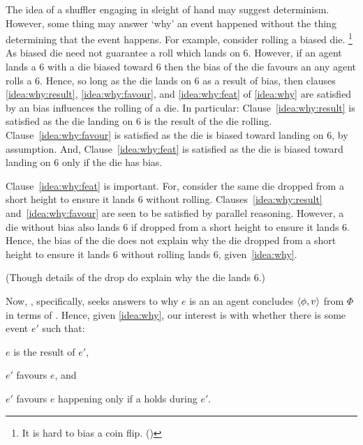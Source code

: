 \begin{note}
  The idea of a shuffler engaging in sleight of hand may suggest determinism.
  However, some thing may answer `why' an event happened without the thing determining that the event happens.
  For example, consider rolling a biased die.%
  \footnote{
    It is hard to bias a coin flip. (\cite{Gelman:2002ww})
  }
  As biased die need not guarantee a roll which lands on 6.
  However, if an agent lands a 6 with a die biased toward 6 then the bias of the die favours an  any agent rolls a 6.
  Hence, so long as the die lands on 6 as a result of bias, then clauses \ref{idea:why:result}, \ref{idea:why:favour}, and \ref{idea:why:feat} of \autoref{idea:why} are satisfied by an  bias influences the rolling of a die.
  In particular:
  Clause~\ref{idea:why:result} is satisfied as the die landing on 6 is the result of the die rolling.
  Clause~\ref{idea:why:favour} is satisfied as the die is biased toward landing on 6, by assumption.
  And, Clause~\ref{idea:why:feat} is satisfied as the die is biased toward landing on 6 only if the die has bias.

  Clause~\ref{idea:why:feat} is important.
  For, consider the same die dropped from a short height to ensure it lands 6 without rolling.
  Clauses~\ref{idea:why:result} and~\ref{idea:why:favour} are seen to be satisfied by parallel reasoning.
  However, a die without bias also lands 6 if dropped from a short height to ensure it lands 6.
  Hence, the bias of the die does not explain why the die dropped from a short height to ensure it lands 6 without rolling lands 6, given~\autoref{idea:why}.

  (Though details of the drop do explain why the die lands 6.)
\end{note}


\begin{note}
  Now, \qWhy{}, specifically, seeks answers to why \(e\) is an  an agent concludes \(\langle\phi, v\rangle\) from \(\Phi\) in terms of .
  Hence, given \autoref{idea:why}, our interest is with whether there is some event \(e'\) such that:
  \begin{enumerate*}[label=]
  \item
    \(e\) is the result of \(e'\),
  \item
    \(e'\) favours \(e\), and
  \item
    \(e'\) favours \(e\) happening only if a \fofr{} holds during \(e'\).
  \end{enumerate*}
\end{note}


